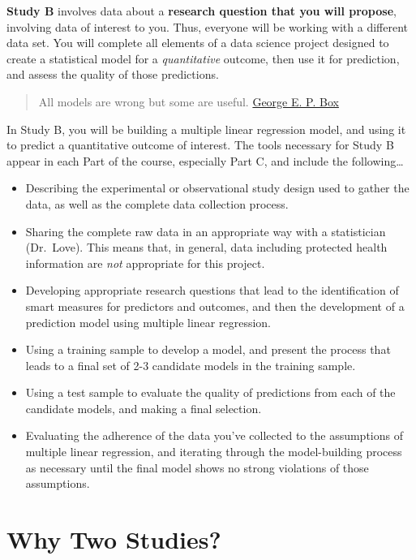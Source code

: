 \documentclass[]{book}
\providecommand{\tightlist}{%
  \setlength{\itemsep}{0pt}\setlength{\parskip}{0pt}}
\begin{document}
\textbf{Study B} involves data about a \textbf{research question that you will propose}, involving data of interest to you. Thus, everyone will be working with a different data set. You will complete all elements of a data science project designed to create a statistical model for a \emph{quantitative} outcome, then use it for prediction, and assess the quality of those predictions.

\begin{quote}
All models are wrong but some are useful. \href{https://en.wikipedia.org/wiki/All_models_are_wrong}{George E. P. Box}
\end{quote}

In Study B, you will be building a multiple linear regression model, and using it to predict a quantitative outcome of interest. The tools necessary for Study B appear in each Part of the course, especially Part C, and include the following\ldots{}

\begin{itemize}
\tightlist
\item
  Describing the experimental or observational study design used to gather the data, as well as the complete data collection process.
\item
  Sharing the complete raw data in an appropriate way with a statistician (Dr.~Love). This means that, in general, data including protected health information are \emph{not} appropriate for this project.
\item
  Developing appropriate research questions that lead to the identification of smart measures for predictors and outcomes, and then the development of a prediction model using multiple linear regression.
\item
  Using a training sample to develop a model, and present the process that leads to a final set of 2-3 candidate models in the training sample.
\item
  Using a test sample to evaluate the quality of predictions from each of the candidate models, and making a final selection.
\item
  Evaluating the adherence of the data you've collected to the assumptions of multiple linear regression, and iterating through the model-building process as necessary until the final model shows no strong violations of those assumptions.
\end{itemize}

\hypertarget{why-two-studies}{%
\section{Why Two Studies?}\label{why-two-studies}}
\end{document}
